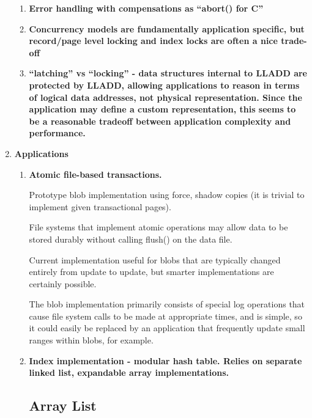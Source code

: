 \documentclass[letterpaper,english]{article}
\begin{document}
\begin{enumerate}
\begin{enumerate}
  \item {\bf Error handling with compensations as {}``abort() for C''}


  \item {\bf Concurrency models are fundamentally application specific, but
  record/page level locking and index locks are often a nice trade-off}

  \item {\bf {}``latching'' vs {}``locking'' - data structures internal to
  LLADD are protected by LLADD, allowing applications to reason in
  terms of logical data addresses, not physical representation. Since
  the application may define a custom representation, this seems to be
  a reasonable tradeoff between application complexity and
  performance.}

\end{enumerate}

\item {\bf Applications }

\begin{enumerate}

  \item {\bf Atomic file-based transactions. 
    
    Prototype blob implementation  using force, shadow copies (it is trivial to implement given transactional
  pages).  

  File systems that implement atomic operations may allow
  data to be stored durably without calling flush() on the data
  file. 

  Current implementation useful for blobs that are typically
  changed entirely from update to update, but smarter implementations
  are certainly possible. 

  The blob implementation primarily consists
  of special log operations that cause file system calls to be made at
  appropriate times, and is simple, so it could easily be replaced by
  an application that frequently update small ranges within blobs, for
  example.}

  \item {\bf Index implementation - modular hash table. Relies on separate
  linked list, expandable array implementations.}

\subsection{Array List}

\end{enumerate}
\end{enumerate}
\end{document}
